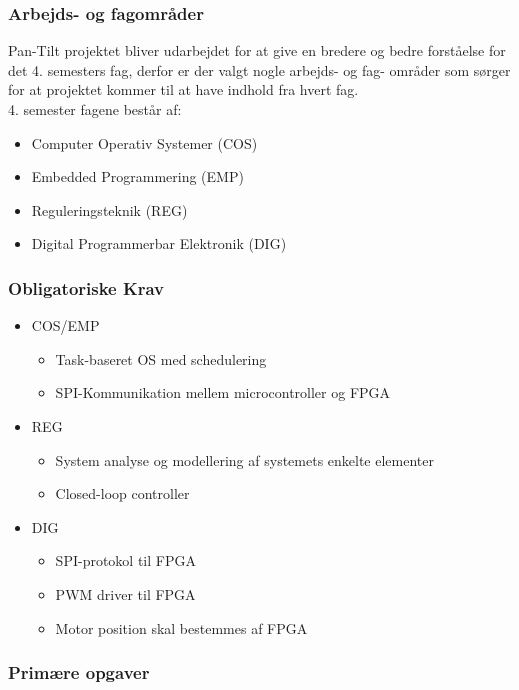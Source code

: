 \subsubsection{Arbejds- og fagområder}
Pan-Tilt projektet bliver udarbejdet for at give en bredere og bedre forståelse for det 4. semesters fag, derfor er der valgt nogle arbejds- og fag- områder som sørger for at projektet kommer til at have indhold fra hvert fag.\\
4. semester fagene består af:
\begin{itemize}[noitemsep]
	\item Computer Operativ Systemer (COS)
	\item Embedded Programmering (EMP)
	\item Reguleringsteknik (REG)
	\item Digital Programmerbar Elektronik (DIG)
\end{itemize}

\subsubsection{Obligatoriske Krav}

\begin{itemize}[noitemsep]
	\item COS/EMP
	\begin{itemize}[noitemsep]
		\item Task-baseret OS med schedulering
		\item SPI-Kommunikation mellem microcontroller og FPGA
	\end{itemize}
	\item REG
	\begin{itemize}[noitemsep]
		\item System analyse og modellering af systemets enkelte elementer
		\item Closed-loop controller
	\end{itemize}
	\item DIG
	\begin{itemize}[noitemsep]
		\item SPI-protokol til FPGA
		\item PWM driver til FPGA
		\item Motor position skal bestemmes af FPGA
	\end{itemize}
\end{itemize}

\subsubsection{Primære opgaver}

